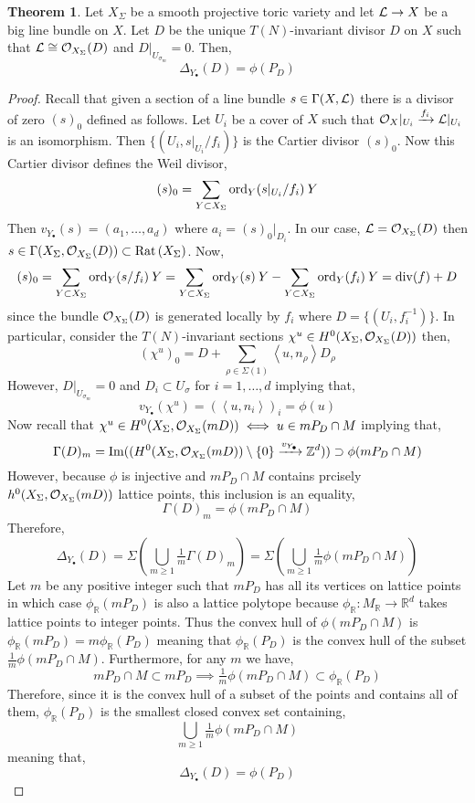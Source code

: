 \documentclass[12pt]{extarticle}
\newcommand{\Z}{\mathbb{Z}}
\newcommand{\R}{\mathbb{R}}
\renewcommand{\Im}[1]{\mathrm{Im}(#1)}
\theoremstyle{definition}
\newtheorem{theorem}{Theorem}[section]
\newcommand{\inner}[2]{\left< #1, #2 \right>}
\begin{document}
\begin{theorem}
Let $X_\Sigma$ be a smooth projective toric variety and let $\mathcal{L} \to X$ be a big line bundle on $X$. Let $D$ be the unique $T(N)$-invariant divisor $D$ on $X$ such that $\mathcal{L} \cong \mathcal{O}_{X_\Sigma}(D)$ and $D|_{U_{\sigma_m}} = 0$. Then,
\[ \Delta_{Y_\bullet}(D) = \phi(P_D) \]
\end{theorem}

\begin{proof}
Recall that given a section of a line bundle $s \in \Gamma(X, \mathcal{L})$ there is a divisor of zero $(s)_0$ defined as follows. Let $U_i$ be a cover of $X$ such that $\mathcal{O}_{X}|_{U_i} \xrightarrow{f_i} \mathcal{L} |_{U_i}$ is an isomorphism. Then $\{ (U_i, s|_{U_i} / f_i) \}$ is the Cartier divisor $(s)_0$. Now this Cartier divisor defines the Weil divisor,
\[ (s)_0 = \sum_{Y \subset X_\Sigma} \mathrm{ord}_{Y}(s|_{U_i} / f_i) \: Y \]
Then $v_{Y_\bullet}(s) = (a_1, \dots, a_d)$ where $a_i = (s)_0 |_{D_i}$. 
In our case, $\mathcal{L} = \mathcal{O}_{X_\Sigma}(D)$ then $s \in \Gamma(X_\Sigma, \mathcal{O}_{X_\Sigma}(D)) \subset \mathrm{Rat} \left( X_\Sigma \right)$. Now,
\[ (s)_0 = \sum_{Y \subset X_\Sigma} \mathrm{ord}_{Y}(s / f_i) \: Y = \sum_{Y \subset X_\Sigma} \mathrm{ord}_{Y}(s) \: Y - \sum_{Y \subset X_\Sigma} \mathrm{ord}_{Y}(f_i) \: Y = \mathrm{div}{(f)} + D \]
since the bundle $\mathcal{O}_{X_\Sigma}(D)$ is generated locally by $f_i$ where $D = \{(U_i, f_i^{-1})\}$. In particular, consider the $T(N)$-invariant sections $\chi^u \in H^0(X_\Sigma, \mathcal{O}_{X_\Sigma}(D))$ then,
\[ (\chi^u)_0 =  D + \sum_{\rho \in \Sigma(1)} \inner{u}{n_\rho} D_\rho \]
However, $D |_{U_{\sigma_m}} = 0$ and $D_i \subset U_\sigma$ for $i = 1, \dots, d$ implying that,
\[ v_{Y_\bullet}(\chi^u) = (\inner{u}{n_i})_i = \phi(u) \]
Now recall that $\chi^u \in H^0(X_\Sigma, \mathcal{O}_{X_\Sigma}(mD)) \iff u \in m P_D \cap M$  implying that,
\[ \Gamma(D)_m = \Im{( H^0(X_\Sigma, \struct{X_\Sigma}(m D)) \setminus \{ 0 \} \xrightarrow{v_{Y_\bullet}} \Z^d )} \supset \phi(m P_D \cap M) \] 
However, because $\phi$ is injective and $m P_D \cap M$ contains prcisely $h^0(X_\Sigma, \mathcal{O}_{X_\Sigma}(m D))$ lattice points, this inclusion is an equality,
\[ \Gamma(D)_m = \phi(m P_D \cap M) \]
Therefore,
\[ \Delta_{Y_\bullet}(D) = \Sigma \left( \bigcup_{m \ge 1} \tfrac{1}{m} \Gamma(D)_m \right) = \Sigma \left( \bigcup_{m \ge 1} \tfrac{1}{m} \phi(m P_D \cap M) \right) \]
Let $m$ be any positive integer such that $m P_D$ has all its vertices on lattice points in which case $\phi_\R(m P_D)$ is also a lattice polytope because $\phi_\R : M_\R \to \R^d$ takes lattice points to integer points. Thus the convex hull of $\phi(m P_D \cap M)$ is $\phi_{\R}(m P_D) = m \phi_{\R}(P_D)$ meaning that $\phi_\R(P_D)$ is the convex hull of the subset $\frac{1}{m} \phi(m P_D \cap M)$. Furthermore, for any $m$ we have,
\[ m P_D \cap M \subset m P_D \implies \tfrac{1}{m} \phi(m P_D \cap M) \subset \phi_{\R}(P_D) \]
Therefore, since it is the convex hull of a subset of the points and contains all of them, $\phi_\R(P_D)$ is the smallest closed convex set containing, 
\[ \bigcup_{m \ge 1} \tfrac{1}{m} \phi(m P_D \cap M) \]
meaning that,
\[ \Delta_{Y_\bullet}(D) = \phi(P_D) \]
\end{proof}
\end{document}

